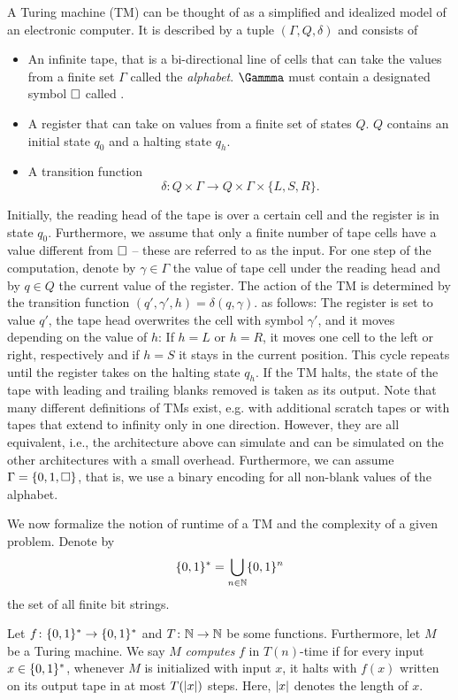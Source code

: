 A Turing machine (TM) can be thought of as a simplified and idealized model of an electronic computer.
It is described by a tuple $(\Gamma, Q, \delta)$ and consists of
\begin{itemize}
  \item An infinite tape, that is a bi-directional line of cells that can take the values from a finite set $\Gamma$ called the \emph{alphabet}.
    $\Gammma$ must contain a designated symbol $\square$ called .
  \item A register that can take on values from a finite set of states $Q$.
    $Q$ contains an initial state $q_0$ and a halting state $q_h$.
  \item A transition function
    \[
      \delta\colon Q \times \Gamma \to Q \times \Gamma \times \{L, S, R\}.
    \]
\end{itemize}
Initially, the reading head of the tape is over a certain cell and the register is in state $q_0$.
Furthermore, we assume that only a finite number of tape cells have a value different from $\square$ -- these are referred to as the input.
For one step of the computation, denote by $\gamma \in \Gamma$ the value of tape cell under the reading head and by $q \in Q$ the current value of the register.
The action of the TM is determined by the transition function
\(
  (q', \gamma', h) = \delta(q, \gamma).
\)
as follows:
The register is set to value $q'$, the tape head overwrites the cell with symbol $\gamma'$, and it moves depending on the value of $h$:
If $h = L$ or $h = R$, it moves one cell to the left or right, respectively and if $h = S$ it stays in the current position.
This cycle repeats until the register takes on the halting state $q_h$.
If the TM halts, the state of the tape with leading and trailing blanks removed is taken as its output.
Note that many different definitions of TMs exist, e.g. with additional scratch tapes or with tapes that extend to infinity only in one direction.
However, they are all equivalent, i.e., the architecture above can simulate and can be simulated on the other architectures with a small overhead.
Furthermore, we can assume $\Gamma = \{0, 1, \square\}$, that is, we use a binary encoding for all non-blank values of the alphabet.

We now formalize the notion of runtime of a TM and the complexity of a given problem.
Denote by
\[
  \{0, 1\}^* = \bigcup_{n \in \mathbb{N}} \{0, 1\}^n
\]
the set of all finite bit strings.

\begin{definition}{\cite[Def.\ 1.3]{Arora_2009_Computational}}
  \label{def:complexity.runtime}
  Let $f\colon \{0, 1\}^* \to \{0, 1\}^*$ and $T\colon \mathbb{N} \to \mathbb{N}$ be some functions.
  Furthermore, let $M$ be a Turing machine.
  We say $M$ \emph{computes} $f$ in $T(n)$-time if for every input $x \in \{0, 1\}^*$, whenever $M$ is initialized with input $x$, it halts with $f(x)$ written on its output tape in at most $T({\vert x\vert})$ steps.
  Here, ${\vert x\vert}$ denotes the length of $x$.
\end{definition}


